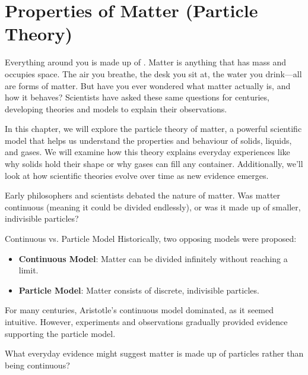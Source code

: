 \chapter{Properties of Matter (Particle Theory)}

\FloatBarrier
\1

Everything around you is made up of . Matter is anything that has mass and occupies space. The air you breathe, the desk you sit at, the water you drink—all are forms of matter. But have you ever wondered what matter actually is, and how it behaves? Scientists have asked these same questions for centuries, developing theories and models to explain their observations.

In this chapter, we will explore the particle theory of matter, a powerful scientific model that helps us understand the properties and behaviour of solids, liquids, and gases. We will examine how this theory explains everyday experiences like why solids hold their shape or why gases can fill any container. Additionally, we'll look at how scientific theories evolve over time as new evidence emerges.

\FloatBarrier
\1

Early philosophers and scientists debated the nature of matter. Was matter continuous (meaning it could be divided endlessly), or was it made up of smaller, indivisible particles?

\begin{keyconcept}{Continuous vs. Particle Model}
Historically, two opposing models were proposed:
\begin{itemize}
    \item \textbf{Continuous Model}: Matter can be divided infinitely without reaching a limit.
    \item \textbf{Particle Model}: Matter consists of discrete, indivisible particles.
\end{itemize}
\end{keyconcept}

For many centuries, Aristotle's continuous model dominated, as it seemed intuitive. However, experiments and observations gradually provided evidence supporting the particle model.

\begin{stopandthink}
What everyday evidence might suggest matter is made up of particles rather than being continuous?
\end{stopandthink}


